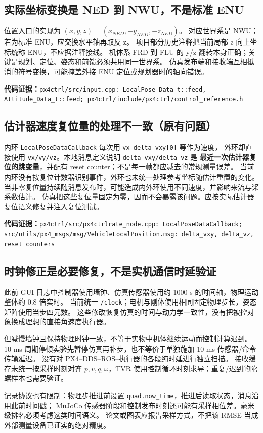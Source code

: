 \documentclass[UTF8,a4paper,11pt,fontset=fandol]{ctexart}
\newcommand{\code}[1]{{\small\nolinkurl{#1}}}
\newcommand{\source}[1]{\par\noindent\textbf{代码证据：}\code{#1}\par}
\begin{document}
\subsection{实际坐标变换是 NED 到 NWU，不是标准 ENU}
位置入口的实现为 $(x,y,z)=(x_{NED},-y_{NED},-z_{NED})$。
对应世界系是 NWU；若为标准 ENU，应交换水平轴再取反 z。
项目部分历史注释把当前局部 z 向上坐标统称 ENU，不应据注释接线。
机体系 FRD 到 FLU 的 y/z 翻转本身正确；关键是规划、定位、姿态和前馈必须共用同一世界系。
仿真发布端和接收端互相抵消的符号变换，可能掩盖外接 ENU 定位或规划器时的轴向错误。
\source{px4ctrl/src/input.cpp: LocalPose_Data_t::feed, Attitude_Data_t::feed; px4ctrl/include/px4ctrl/control_reference.h}

\subsection{估计器速度复位量的处理不一致（原有问题）}
内环 \code{LocalPoseDataCallback} 每次用 \code{vx-delta_vxy[0]} 等作为速度，
外环却直接使用 \code{vx/vy/vz}。本地消息定义说明 \code{delta_vxy/delta_vz} 是
\textbf{最近一次估计器复位的跳变量}，并配有 reset counter；不是每一帧都应减去的常规测量误差。
当前内环没有按复位计数器识别事件，外环也未统一处理参考坐标随估计重置的变化。
当非零复位量持续随消息发布时，可能造成内外环使用不同速度，并影响来流与桨系数估计。
仿真把这些复位量固定为零，因而不会暴露该问题。应按实际估计器复位语义修复并注入复位测试。
\source{px4ctrl/src/px4ctrlrate_node.cpp: LocalPoseDataCallback; src/utils/px4_msgs/msg/VehicleLocalPosition.msg: delta_vxy, delta_vz, reset counters}

\subsection{时钟修正是必要修复，不是实机通信时延验证}
此前 GUI 日志中控制器使用墙钟、仿真传感器使用约 1000 s 的时间轴，物理运动整体约 0.8 倍实时。
当前统一 \code{/clock}；电机与刚体使用相同固定物理步长，姿态矩阵使用当步四元数。
这些修改恢复仿真的时间与动力学一致性，没有把被控对象换成理想的直接角速度执行器。

但减慢墙钟且保持物理时钟一致，不等于实物中机体继续运动而控制计算迟到。
10 ms 周期停顿实验先暂停仿真再补步，也不等价于单独施加 10 ms 传感器/命令传输延迟。
没有对 PX4--DDS--ROS--执行器的各段纯时延进行独立扫描。
接收缓存未统一按采样时刻对齐 $p,v,q,\omega$，TVR 使用控制循环时刻求导；重复/迟到的陀螺样本也需要验证。

记录协议也有限制：物理步推进前设置 \code{quad.now_time}，推进后读取状态，消息沿用此前时间戳；
MuJoCo 传感器阶段和控制发布时刻还可能有采样相位差。毫米级排名必须考虑这类时间语义。
论文或图表应报告采样方式，不把该 RMSE 当成外部测量设备已证实的绝对精度。
\end{document}
